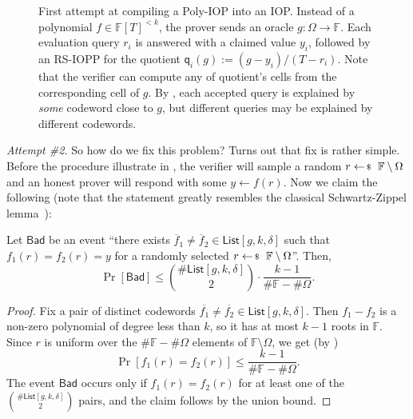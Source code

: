 \documentclass[../../book]{subfiles}
\begin{document}
\begin{figure}[h!]
{%
    }

    \caption{First attempt at compiling a Poly-IOP into an IOP. Instead of a polynomial $f \in \mathbb{F}[T]^{<k}$, the prover sends an oracle $g: \Omega \to \mathbb{F}$. Each evaluation query $r_i$ is answered with a claimed value $y_i$, followed by an RS-IOPP for the quotient $\mathsf{q}_i(g) := (g - y_i)/(T - r_i)$. Note that the verifier can compute any of quotient's cells from the corresponding cell of $g$. By , each accepted query is explained by \emph{some} codeword close to $g$, but different queries may be explained by different codewords.}
    \label{fig:poly-iop-first-attempt}
\end{figure}

\textit{Attempt \#2.} So how do we fix this problem? Turns out that fix is rather simple.
Before the procedure illustrate in , the verifier will sample a random $r \leftarrowS \mathbb{F} \setminus \Omega$ and an honest prover will respond with some $y \gets f(r)$.
Now we claim the following (note that the statement greatly resembles the classical Schwartz-Zippel lemma~):

\begin{proposition}\label{prop:iopp-bad-event}
    Let $\mathsf{Bad}$ be an event ``there exists $\overline{f}_1 \neq \overline{f}_2 \in \mathsf{List}[g,k,\delta]$ such that $f_1(r) = f_2(r) = y$ for a randomly selected $r \leftarrowS \mathbb{F} \setminus \Omega$''.
    Then,
    \begin{equation*}
      \Pr\left[ \mathsf{Bad} \right] \leq \binom{\#\mathsf{List}[g,k,\delta]}{2} \cdot \frac{k-1}{\#\mathbb{F} - \#\Omega}.
    \end{equation*}
\end{proposition}

\begin{proof}
    Fix a pair of distinct codewords $\overline{f_1} \neq \overline{f_2} \in \mathsf{List}[g,k,\delta]$.
    Then $f_1 - f_2$ is a non-zero polynomial of degree less than $k$, so it has at most $k - 1$ roots in $\mathbb{F}$.
    Since $r$ is uniform over the $\#\mathbb{F} - \#\Omega$ elements of $\mathbb{F} \setminus \Omega$, we get (by )
    \begin{equation*}
        \Pr\left[ f_1(r) = f_2(r) \right] \leq \frac{k-1}{\#\mathbb{F} - \#\Omega}.
    \end{equation*}
    The event $\mathsf{Bad}$ occurs only if $f_1(r) = f_2(r)$ for at least one of the $\binom{\#\mathsf{List}[g,k,\delta]}{2}$ pairs, and the claim follows by the union bound.
\end{proof}
\end{document}

